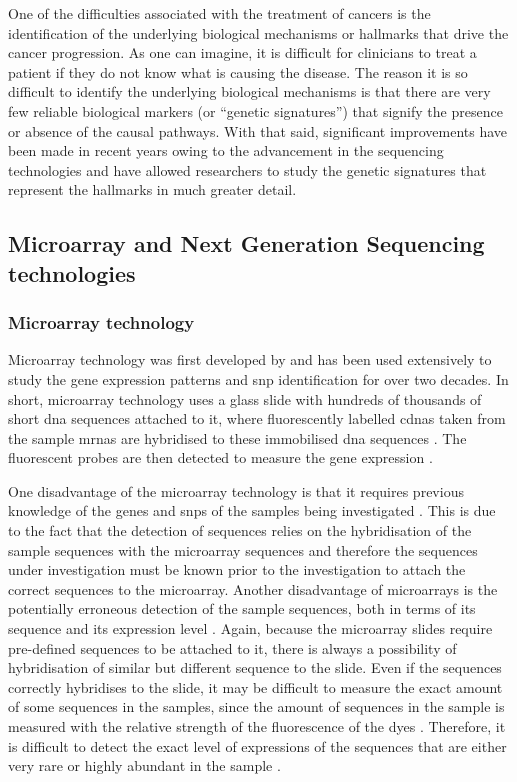 One of the difficulties associated with the treatment of cancers is the identification of the underlying biological mechanisms or hallmarks that drive the cancer progression.
As one can imagine, it is difficult for clinicians to treat a patient if they do not know what is causing the disease.
The reason it is so difficult to identify the underlying biological mechanisms is that there are very few reliable biological markers (or ``genetic signatures'') that signify the presence or absence of the causal pathways.
With that said, significant improvements have been made in recent years owing to the advancement in the sequencing technologies and have allowed researchers to study the genetic signatures that represent the hallmarks in much greater detail.

\subsection{Microarray and Next Generation Sequencing technologies}
\label{sub:microarray_and_next_generation_sequencing_technologies}

\subsubsection{Microarray technology}
\label{ssub:microarray_technology}

Microarray technology was first developed by \citet{Schena1995} and has been used extensively to study the gene expression patterns and \gls{snp} identification for over two decades.
In short, microarray technology uses a glass slide with hundreds of thousands of short \acrshort{dna} sequences attached to it, where fluorescently labelled \glspl{cdna} taken from the sample \glspl{mrna} are hybridised to these immobilised \acrshort{dna} sequences \citep{Schena1995,Schulze2001}.
The fluorescent probes are then detected to measure the gene expression \citep{Schena1995,Schulze2001}.

One disadvantage of the microarray technology is that it requires previous knowledge of the genes and \glspl{snp} of the samples being investigated \citep{Hurd2009}.
This is due to the fact that the detection of sequences relies on the hybridisation of the sample sequences with the microarray sequences and therefore the sequences under investigation must be known prior to the investigation to attach the correct sequences to the microarray.
Another disadvantage of microarrays is the potentially erroneous detection of the sample sequences, both in terms of its sequence and its expression level \citep{Hurd2009}.
Again, because the microarray slides require pre-defined sequences to be attached to it, there is always a possibility of hybridisation of similar but different sequence to the slide.
Even if the sequences correctly hybridises to the slide, it may be difficult to measure the exact amount of some sequences in the samples, since the amount of sequences in the sample is measured with the relative strength of the fluorescence of the dyes \citep{Hurd2009}.
Therefore, it is difficult to detect the exact level of expressions of the sequences that are either very rare or highly abundant in the sample \citep{Hurd2009}.

